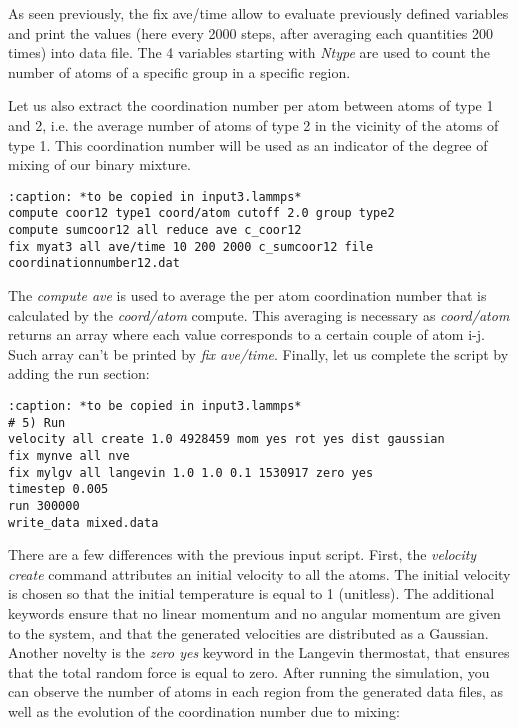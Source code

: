 \noindent As seen previously, the fix ave/time
allow to evaluate previously defined variables and print
the values (here every 2000 steps, after averaging each quantities 200 times)
into data file. The 4 variables starting with \textit{Ntype} are used to count
the number of atoms of a specific group in a specific
region. 

Let us also extract the coordination number per atom between atoms 
of type 1 and 2, i.e. the average number of atoms of type 2 in the vicinity 
of the atoms of type 1. This coordination number will be used as an indicator of the 
degree of mixing of our binary mixture. 

\begin{verbatim}
:caption: *to be copied in input3.lammps*
compute coor12 type1 coord/atom cutoff 2.0 group type2
compute sumcoor12 all reduce ave c_coor12
fix myat3 all ave/time 10 200 2000 c_sumcoor12 file coordinationnumber12.dat
\end{verbatim}

\noindent The \textit{compute ave} is used to average the per atom
coordination number that is calculated by the \textit{coord/atom} compute.
This averaging is necessary as \textit{coord/atom} returns an array where each value corresponds 
to a certain couple of atom i-j. Such array can't be printed by \textit{fix ave/time}. 
Finally, let us complete the script by adding the run section:

\begin{verbatim}
:caption: *to be copied in input3.lammps*
# 5) Run
velocity all create 1.0 4928459 mom yes rot yes dist gaussian
fix mynve all nve
fix mylgv all langevin 1.0 1.0 0.1 1530917 zero yes
timestep 0.005
run 300000
write_data mixed.data
\end{verbatim}

\noindent There are a few differences with the
previous input script. First, the \textit{velocity create}
command attributes an initial velocity to all the atoms.
The initial velocity is chosen so that the initial
temperature is equal to 1 (unitless). The additional
keywords ensure that no linear momentum and no angular
momentum are given to the system, and that the generated
velocities are distributed as a Gaussian. Another novelty
is the \textit{zero yes} keyword in the Langevin thermostat, that
ensures that the total random force is equal to zero.
After running the simulation, you can observe the number
of atoms in each region from the generated data files, as
well as the evolution of the coordination number due to
mixing:

